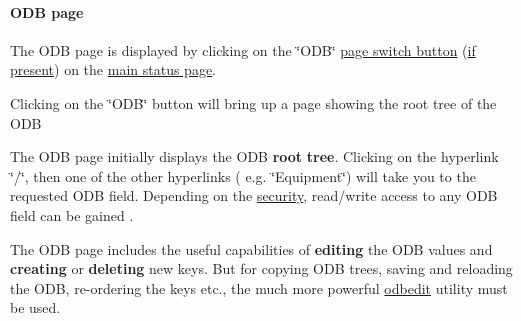 \par


\label{index_end}
\hypertarget{index_end}{}
 \paragraph{ODB page}\label{RC_mhttpd_ODB_page}
\label{RC_mhttpd_ODB_page_idx_mhttpd_page_ODB}
\hypertarget{RC_mhttpd_ODB_page_idx_mhttpd_page_ODB}{}
 \par




\label{RC_mhttpd_ODB_page_idx_edit_ODB_using-mhttpd}
\hypertarget{RC_mhttpd_ODB_page_idx_edit_ODB_using-mhttpd}{}
 \par


The ODB page is displayed by clicking on the \char`\"{}ODB\char`\"{} \hyperlink{RC_mhttpd_status_page_features_RC_mhttpd_status_Page_buttons}{page switch button} (\hyperlink{RC_mhttpd_status_page_features_RC_mhttpd_status_menu_buttons}{if present}) on the \hyperlink{RC_mhttpd_Main_Status_page_RC_mhttpd_main_status}{main status page}.

\par
\par
\par
 \begin{center}  Clicking on the \char`\"{}ODB\char`\"{} button will bring up a page showing the root tree of the ODB  \par
\par
\par
  \end{center}  \par
\par
\par


The ODB page initially displays the ODB {\bfseries root} {\bfseries tree}. Clicking on the hyperlink \char`\"{}/\char`\"{}, then one of the other hyperlinks ( e.g. \char`\"{}Equipment\char`\"{}) will take you to the requested ODB field. Depending on the \hyperlink{RC_customize_ODB_RC_Access_Control}{security}, read/write access to any ODB field can be gained .

The ODB page includes the useful capabilities of {\bfseries editing} the ODB values and {\bfseries creating} or {\bfseries deleting} new keys. But for copying ODB trees, saving and reloading the ODB, re-\/ordering the keys etc., the much more powerful \hyperlink{RC_odbedit_utility}{odbedit} utility must be used. \par
\par


